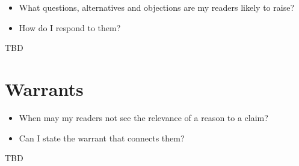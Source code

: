 \documentclass{farlamp}
\begin{document}
\begin{itemize}
\item What questions, alternatives and objections are my readers likely to
    raise?
\item How do I respond to them?
\end{itemize}

TBD


\section{Warrants}

\begin{itemize}
\item When may my readers not see the relevance of a reason to a claim?
\item Can I state the warrant that connects them?
\end{itemize}

TBD


\begin{FlushLeft}
\printbibliography
\end{FlushLeft}
\end{document}
